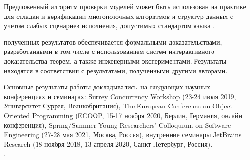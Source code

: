 Предложенный  алгоритм проверки моделей может быть использован на практике
для отладки и верификации многопоточных алгоритмов и структур данных 
с учетом слабых сценариев исполнения, допустимых стандартом языка \CLANG. 

{\reliability} полученных результатов обеспечивается 
формальными доказательствами, разработанными в том числе с использованием
систем интерактивного доказательства теорем, 
а также инженерными экспериментами. 
Результаты находятся в соответствии с результатами, полученными другими авторами.

{\probation}
Основные результаты работы докладывались~на
следующих научных конференциях и семинарах:
Surrey Concurrency Workshop (23-24 июля 2019, Университет Суррея, Великобритания),
The European Conference on Object-Oriented Programming
(ECOOP, 15-17 ноября 2020, Берлин, Германия, онлайн конференция),
Spring/Summer Young Researchers' Colloquium on Software Engineering
(27-28 мая 2021, Москва, Россия),
внутренние семинары JetBrains Research
(18 ноября 2018, 13 апреля 2020, Санкт-Петербург, Россия). \\
.



